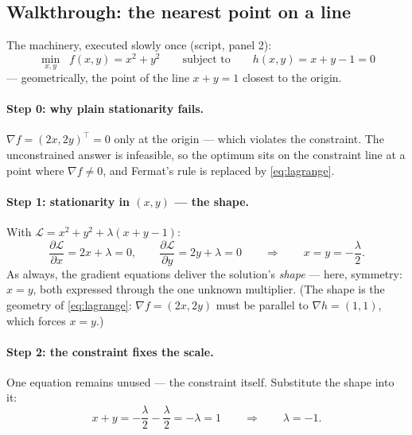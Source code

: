 \documentclass[11pt]{article}
\begin{document}
\subsection{Walkthrough: the nearest point on a line}

The machinery, executed slowly once (script, panel 2):
\begin{equation*}
  \min_{x,y}\;\; f(x,y) = x^2 + y^2
  \qquad\text{subject to}\qquad
  h(x,y) = x + y - 1 = 0
\end{equation*}
--- geometrically, the point of the line $x+y=1$ closest to the origin.

\paragraph{Step 0: why plain stationarity fails.}
$\nabla f = (2x, 2y)^\top = 0$ only at the origin --- which violates
the constraint. The unconstrained answer is infeasible, so the optimum
sits on the constraint line at a point where $\nabla f \ne 0$, and
Fermat's rule is replaced by \eqref{eq:lagrange}.

\paragraph{Step 1: stationarity in $(x,y)$ --- the shape.}
With $\mathcal{L} = x^2 + y^2 + \lambda(x + y - 1)$:
\begin{equation*}
  \frac{\partial \mathcal{L}}{\partial x} = 2x + \lambda = 0,
  \qquad
  \frac{\partial \mathcal{L}}{\partial y} = 2y + \lambda = 0
  \qquad\Longrightarrow\qquad
  x = y = -\frac{\lambda}{2}.
\end{equation*}
As always, the gradient equations deliver the solution's \emph{shape}
--- here, symmetry: $x = y$, both expressed through the one unknown
multiplier. (The shape is the geometry of \eqref{eq:lagrange}:
$\nabla f = (2x,2y)$ must be parallel to $\nabla h = (1,1)$, which
forces $x = y$.)

\paragraph{Step 2: the constraint fixes the scale.}
One equation remains unused --- the constraint itself. Substitute the
shape into it:
\begin{equation*}
  x + y = -\frac{\lambda}{2} - \frac{\lambda}{2} = -\lambda = 1
  \qquad\Longrightarrow\qquad
  \lambda = -1 .
\end{equation*}
\end{document}
